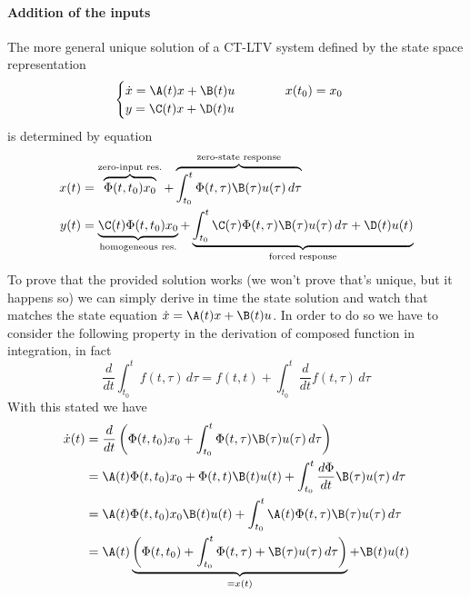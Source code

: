 	\paragraph{Addition of the inputs} The more general unique solution of a CT-LTV system defined by the state space representation
	\[ \begin{cases}
		\dot x = \A(t) x + \B(t) u \hspace{1.4cm} x(t_0) = x_0\\ 
		y = \C(t) x + \D(t) u
	\end{cases} \]
	is determined by equation
	\begin{equation} \label{eq:lin:varconstsants}
	\begin{split}
		x(t) & = \overbrace{\Phi(t,t_0) x_0}^\textrm{zero-input res.} + \overbrace{\int_{t_0}^t \Phi(t,\tau) \B(\tau) u(\tau) \, d\tau}^\textrm{zero-state response} \\
		y(t) & = \underbrace{\C(t) \Phi(t,t_0) x_0}_\textrm{homogeneous res.} + \underbrace{ \int_{t_0}^t \C(\tau) \Phi(t,\tau) \B(\tau) u(\tau)\, d\tau + \D(t) u(t) }_\textrm{forced response}
	\end{split}
	\end{equation}
	To prove that the provided solution works (we won't prove that's unique, but it happens so) we can simply derive in time the state solution and watch that matches the state equation $\dot x = \A(t) x + \B(t) u$. In order to do so we have to consider the following property in the derivation of composed function in integration, in fact
	\[ \frac{d}{dt} \int_{t_0}^t f(t,\tau)\, d\tau = f(t,t) + \int_{t_0}^t \frac{d}{dt}f(t,\tau)\, d\tau \]
	With this stated we have
	\begin{align*}
		\dot x(t) & = \frac{d}{dt} \left( \Phi(t,t_0) x_0 + \int_{t_0}^t \Phi(t,\tau) \B(\tau) u(\tau) \, d\tau \right) \\
		& = \A(t) \Phi(t,t_0) x_0 + \Phi(t,t) \B(t)u(t) + \int_{t_0}^t \frac{d\Phi}{dt} \B(\tau) u(\tau)\, d\tau \\
		& = \A(t)\Phi(t,t_0) x_0 \B(t) u(t) +  \int_{t_0}^t \A(t) \Phi(t,\tau) \B(\tau) u(\tau)\, d\tau \\
		& = \A(t) \underbrace{\left( \Phi(t,t_0) + \int_{t_0}^t \Phi(t,\tau) + \B(\tau) u(\tau)\, d\tau \right)}_{=x(t)} + \B(t)u(t)
	\end{align*}
	
